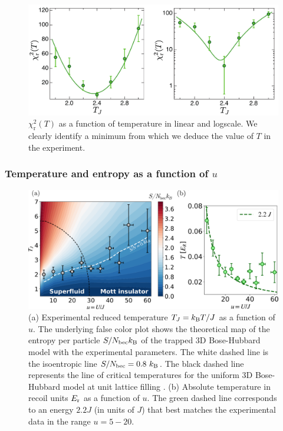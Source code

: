 \begin{figure}
    \centering
    \includegraphics[width=1\textwidth]{Fig/Chapter3/chi_square.pdf}
    \caption[$\chi_{\mathrm{r}}^{2}(T)$ as a function of temperature in linear and logscale]{$\chi_{\mathrm{r}}^{2}(T)$ as a function of temperature in linear and logscale. We clearly identify a minimum from which we deduce the value of $T$ in the experiment.}
    \label{fig:chi_vs_T}
\end{figure}

\subsubsection{Temperature and entropy as a function of $u$}

\begin{figure}
    \centering
    \includegraphics[width=\textwidth]{Fig/Chapter3/temperature.png}
    \caption[Experimental reduced temperature $T_J=\kB T/J$ as a function of $u$ and absolute temperature in recoil units $E_{\rm{r}}$ as a function of $u$]{(a) Experimental reduced temperature $T_J=\kB T/J$ as a function of $u$. The underlying false color plot shows the theoretical map of the entropy per particle $S/N_{\rm{bec}} k_{\mathrm{B}}$ of the trapped 3D Bose-Hubbard model with the experimental parameters. The white dashed line is the isoentropic line $S/N_{\rm{bec}}=0.8 \ k_{\mathrm{B}}$. The black dashed line represents the line of critical temperatures for the uniform 3D Bose-Hubbard model at unit lattice filling \cite{capogrosso2007phase}. (b) Absolute temperature in recoil units $E_{\rm{r}}$ as a function of $u$. The green dashed line corresponds to an energy $2.2 J$ (in units of $J$) that best matches the experimental data in the range $u=5-20$.}
    \label{fig:T_vs_u}
\end{figure}

